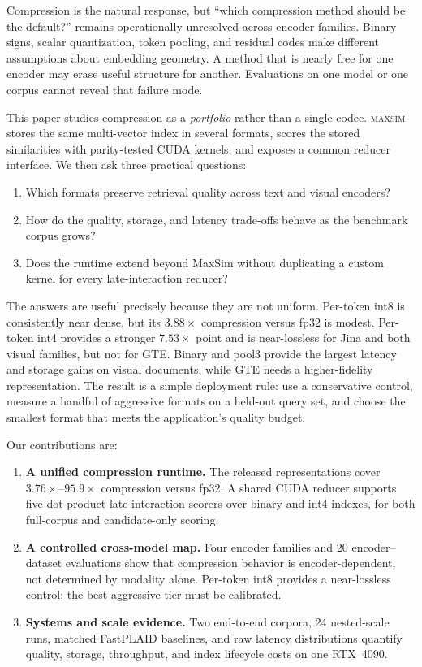 \documentclass{article}
\newcommand{\sysname}{\textsc{maxsim}}
\begin{document}
Compression is the natural response, but ``which compression method should be
the default?'' remains operationally unresolved across encoder families.
Binary signs, scalar quantization, token pooling, and residual codes make
different assumptions about embedding geometry. A method that is nearly free
for one encoder may erase useful structure for another. Evaluations on one
model or one corpus cannot reveal that failure mode.

This paper studies compression as a \emph{portfolio} rather than a single
codec. \sysname{} stores the same multi-vector index in several formats,
scores the stored similarities with parity-tested CUDA kernels, and exposes a
common reducer interface. We then ask three practical questions:

\begin{enumerate}
\item Which formats preserve retrieval quality across text and visual
encoders?
\item How do the quality, storage, and latency trade-offs behave as the
benchmark corpus grows?
\item Does the runtime extend beyond MaxSim without duplicating a custom
kernel for every late-interaction reducer?
\end{enumerate}

The answers are useful precisely because they are not uniform. Per-token int8
is consistently near dense, but its $3.88\times$ compression versus fp32 is
modest. Per-token int4 provides a stronger $7.53\times$ point and is
near-lossless for Jina and both visual families, but not for GTE.
Binary and pool3 provide the largest latency and storage gains on visual
documents, while GTE needs a higher-fidelity representation. The result is a
simple deployment rule: use a conservative control, measure a handful of
aggressive formats on a held-out query set, and choose the smallest format
that meets the application's quality budget.

Our contributions are:

\begin{enumerate}
\item \textbf{A unified compression runtime.} The released representations
cover $3.76\times$--$95.9\times$ compression versus fp32. A shared CUDA
reducer supports five dot-product late-interaction scorers over binary and
int4 indexes, for both full-corpus and candidate-only scoring.
\item \textbf{A controlled cross-model map.} Four encoder families and 20
encoder--dataset evaluations show that compression behavior is
encoder-dependent, not determined by modality alone. Per-token int8 provides
a near-lossless control; the best aggressive tier must be calibrated.
\item \textbf{Systems and scale evidence.} Two end-to-end corpora, 24
nested-scale runs, matched FastPLAID baselines, and raw latency distributions
quantify quality, storage, throughput, and index lifecycle costs on one
RTX~4090.
\end{enumerate}
\end{document}
